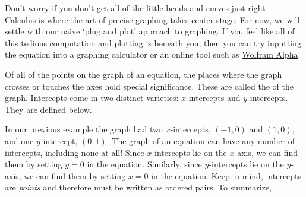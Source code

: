 {\medskip



Don't worry if you don't get all of the little bends and curves just right $-$ Calculus is where the art of precise graphing takes center stage.  For now, we will settle with our naive `plug and plot' approach to graphing.  If you feel like all of this tedious computation and plotting is beneath you, then you can try inputting the equation into a graphing calculator or an online tool such as \href{http://www.wolframalpha.com/}{Wolfram Alpha}.
}

\medskip

Of all of the points on the graph of an equation, the places where the graph crosses or touches the axes hold special significance.  These are called the   of the graph.  Intercepts come in two distinct varieties: $x$-intercepts and $y$-intercepts.  They are defined below.

\medskip



\medskip

In our previous example the graph had two $x$-intercepts, $(-1,0)$ and $(1,0)$, and one $y$-intercept, $(0,1)$.  The graph of an equation can have any number of intercepts, including none at all!  Since $x$-intercepts lie on the $x$-axis, we can find them by setting $y = 0$ in the equation.  Similarly, since $y$-intercepts lie on the $y$-axis, we can find them by setting $x = 0$ in the equation.  Keep in mind, intercepts are \emph{points} and therefore must be written as ordered pairs.  To summarize,

\medskip


